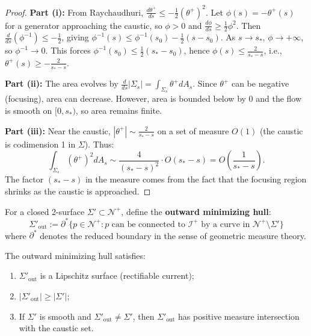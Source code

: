 \begin{proof}
\textbf{Part (i):} From Raychaudhuri, $\frac{d\theta^+}{ds} \leq -\frac{1}{2}(\theta^+)^2$. Let $\phi(s) = -\theta^+(s)$ for a generator approaching the caustic, so $\phi > 0$ and $\frac{d\phi}{ds} \geq \frac{1}{2}\phi^2$. Then $\frac{d}{ds}(\phi^{-1}) \leq -\frac{1}{2}$, giving $\phi^{-1}(s) \leq \phi^{-1}(s_0) - \frac{1}{2}(s - s_0)$. As $s \to s_*$, $\phi \to +\infty$, so $\phi^{-1} \to 0$. This forces $\phi^{-1}(s_0) \leq \frac{1}{2}(s_* - s_0)$, hence $\phi(s) \leq \frac{2}{s_* - s}$, i.e., $\theta^+(s) \geq -\frac{2}{s_* - s}$.

\textbf{Part (ii):} The area evolves by $\frac{d}{ds}|{\Sigma_s}| = \int_{\Sigma_s} \theta^+ dA_s$. Since $\theta^+$ can be negative (focusing), area can decrease. However, area is bounded below by 0 and the flow is smooth on $[0, s_*)$, so area remains finite.

\textbf{Part (iii):} Near the caustic, $|\theta^+| \sim \frac{2}{s_* - s}$ on a set of measure $O(1)$ (the caustic is codimension 1 in $\Sigma$). Thus:
\begin{equation}
\int_{\Sigma_s} (\theta^+)^2 dA_s \sim \frac{4}{(s_* - s)^2} \cdot O(s_* - s) = O\left(\frac{1}{s_* - s}\right).
\end{equation}
The factor $(s_* - s)$ in the measure comes from the fact that the focusing region shrinks as the caustic is approached.
\end{proof}

\begin{definition}
\label{def:outward-hull}
For a closed 2-surface $\Sigma' \subset \mathcal{N}^+$, define the \textbf{outward minimizing hull}:
\begin{equation}
\Sigma'_{\text{out}} := \partial^* \{p \in \mathcal{N}^+ : p \text{ can be connected to } \mathscr{I}^+ \text{ by a curve in } \mathcal{N}^+ \setminus \Sigma'\}
\end{equation}
where $\partial^*$ denotes the reduced boundary in the sense of geometric measure theory.
\end{definition}

\begin{proposition}
\label{prop:outward-hull-properties}
The outward minimizing hull satisfies:
\begin{enumerate}[label=(\roman*)]
\item $\Sigma'_{\mathrm{out}}$ is a Lipschitz surface (rectifiable current);
\item $|\Sigma'_{\mathrm{out}}| \geq |\Sigma'|$;
\item If $\Sigma'$ is smooth and $\Sigma'_{\mathrm{out}} \neq \Sigma'$, then $\Sigma'_{\mathrm{out}}$ has positive measure intersection with the caustic set.
\end{enumerate}
\end{proposition}

